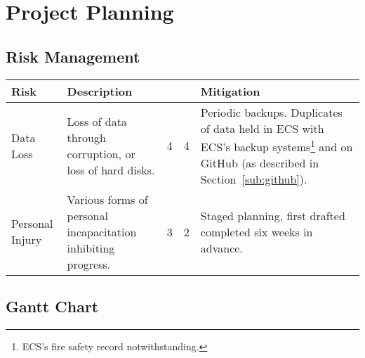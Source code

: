 \chapter{Project Planning}

\begin{landscape}
\section{Risk Management}
\begin{tabu} to 0.9\linewidth { X[3,r] | X[7,l] | X[c] | X[c] | X[7,l] }
\textbf{Risk} & \textbf{Description} &  &  & \textbf{Mitigation} \\ \hline
Data Loss &
  Loss of data through corruption, or loss of hard disks. &
  4 & 4 &
  Periodic backups. Duplicates of data held in ECS with ECS's backup systems\footnote{ECS's fire safety record notwithstanding.} and on GitHub (as described in Section~\ref{sub:github}). \\
Personal Injury &
  Various forms of personal incapacitation inhibiting progress. &
  3 & 2 &
  Staged planning, first drafted completed six weeks in advance. \\
\end{tabu}
\section{Gantt Chart}

\end{landscape}

